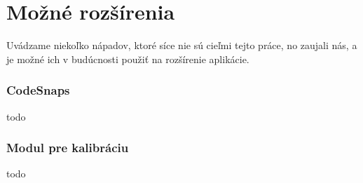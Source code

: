 \section{Možné rozšírenia}
Uvádzame niekoľko nápadov, ktoré síce nie sú cieľmi tejto práce, no zaujali nás, a je možné ich v budúcnosti použiť na rozšírenie aplikácie.

\subsubsection{CodeSnaps}
todo

\subsubsection{Modul pre kalibráciu}
todo